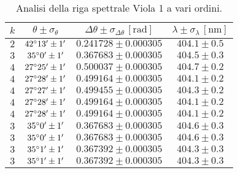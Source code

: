 \documentclass[]{article}
\begin{document}
    \begin{table}[H]
        \centering
        \begin{tabular}{||c|c|c|c||}
            \hline
            $k$ & $\theta \pm \sigma_{\theta}$ & $\Delta\theta \pm \sigma_{\Delta\theta} \, \left[\text{rad}\right]$ & $\lambda \pm \sigma_{\lambda} \, \left[\text{nm}\right]$ \\\hline
            \hline
            $2$ & $42\degree 13' \pm 1'$ & $0.241728 \pm 0.000305$ & $404.1 \pm 0.5$ \\\hline
            $3$ & $35\degree  0' \pm 1'$ & $0.367683 \pm 0.000305$ & $404.5 \pm 0.3$ \\\hline
            $4$ & $27\degree 25' \pm 1'$ & $0.500037 \pm 0.000305$ & $404.7 \pm 0.2$ \\\hline
            $4$ & $27\degree 28' \pm 1'$ & $0.499164 \pm 0.000305$ & $404.1 \pm 0.2$ \\\hline
            $4$ & $27\degree 27' \pm 1'$ & $0.499455 \pm 0.000305$ & $404.3 \pm 0.2$ \\\hline
            $4$ & $27\degree 28' \pm 1'$ & $0.499164 \pm 0.000305$ & $404.1 \pm 0.2$ \\\hline
            $4$ & $27\degree 28' \pm 1'$ & $0.499164 \pm 0.000305$ & $404.1 \pm 0.2$ \\\hline
            $3$ & $35\degree  0' \pm 1'$ & $0.367683 \pm 0.000305$ & $404.6 \pm 0.3$ \\\hline
            $3$ & $35\degree  0' \pm 1'$ & $0.367683 \pm 0.000305$ & $404.6 \pm 0.3$ \\\hline
            $3$ & $35\degree  1' \pm 1'$ & $0.367392 \pm 0.000305$ & $404.3 \pm 0.3$ \\\hline
            $3$ & $35\degree  1' \pm 1'$ & $0.367392 \pm 0.000305$ & $404.3 \pm 0.3$ \\\hline
        \end{tabular}
        \caption{Analisi della riga spettrale Viola 1 a vari ordini.}
        \label{viola-1}
    \end{table}
\end{document}
